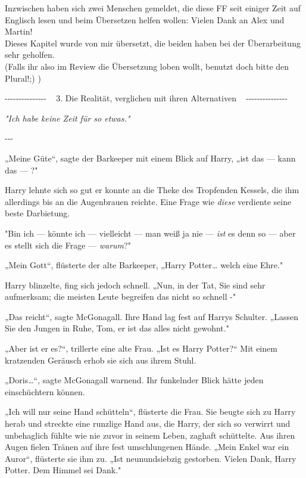 

\hypertarget{die-realituxe4t-verglichen-mit-ihren-alternativen}{%

Inzwischen haben sich zwei Menschen gemeldet, die diese FF seit einiger Zeit auf Englisch lesen und beim Übersetzen helfen wollen: Vielen Dank an Alex und Martin!\\ Dieses Kapitel wurde von mir übersetzt, die beiden haben bei der Überarbeitung sehr geholfen.\\ (Falls ihr also im Review die Übersetzung loben wollt, benutzt doch bitte den Plural!;) )

-\/-\/-\/-\/-\/-\/-\/-\/-\/-\/-\/-\/-\/-\/- ~ 3. Die Realität, verglichen mit ihren Alternativen ~ -\/-\/-\/-\/-\/-\/-\/-\/-\/-\/-\/-\/-\/-\/-

\emph{"Ich habe keine Zeit für so etwas."}

-\/-\/-

„Meine Güte“, sagte der Barkeeper mit einem Blick auf Harry, „ist das --- kann das --- ?"

Harry lehnte sich so gut er konnte an die Theke des Tropfenden Kessels, die ihm allerdings bis an die Augenbrauen reichte. Eine Frage wie \emph{diese} verdiente seine beste Darbietung.

"Bin ich --- könnte ich --- vielleicht --- man weiß ja nie --- \emph{ist} es denn so --- aber es stellt sich die Frage --- \emph{warum}?"

„Mein Gott“, flüsterte der alte Barkeeper, „Harry Potter… welch eine Ehre."

Harry blinzelte, fing sich jedoch schnell. „Nun, in der Tat, Sie sind sehr aufmerksam; die meisten Leute begreifen das nicht so schnell -"

„Das reicht“, sagte McGonagall. Ihre Hand lag fest auf Harrys Schulter. „Lassen Sie den Jungen in Ruhe, Tom, er ist das alles nicht gewohnt."

„Aber ist er es?“, trillerte eine alte Frau. „Ist es Harry Potter?“ Mit einem kratzenden Geräusch erhob sie sich aus ihrem Stuhl.

„Doris…“, sagte McGonagall warnend. Ihr funkelnder Blick hätte jeden einschüchtern können.

„Ich will nur seine Hand schütteln“, flüsterte die Frau. Sie beugte sich zu Harry herab und streckte eine runzlige Hand aus, die Harry, der sich so verwirrt und unbehaglich fühlte wie nie zuvor in seinem Leben, zaghaft schüttelte. Aus ihren Augen fielen Tränen auf ihre fest umschlungenen Hände. „Mein Enkel war ein Auror“, flüsterte sie ihm zu. „Ist neunundsiebzig gestorben. Vielen Dank, Harry Potter. Dem Himmel sei Dank."

}
